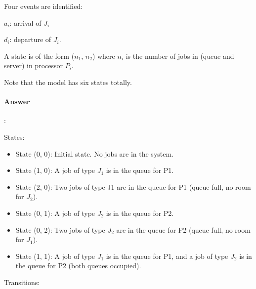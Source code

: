 \documentclass{article}
\begin{document}
\begin{tcolorbox}
  Four events are identified: 
  
  $a_i$: arrival of $J_i$ 

  $d_i$: departure of $J_i$.
  
  A state is of the form ($n_1$, $n_2$) where $n_i$ is the number of jobs in (queue and server) in processor $P_i$. 
  
  Note that the model has six states totally.
\end{tcolorbox}

\paragraph{Answer}:


States:

\begin{itemize}
  \item State (0, 0): Initial state. No jobs are in the system.
  \item State (1, 0): A job of type $J_1$ is in the queue for P1.
  \item State (2, 0): Two jobs of type J1 are in the queue for P1 (queue full, no room for $J_2$).
  \item State (0, 1): A job of type $J_2$ is in the queue for P2.
  \item State (0, 2): Two jobs of type $J_2$ are in the queue for P2 (queue full, no room for $J_1$).
  \item State (1, 1): A job of type $J_1$ is in the queue for P1, and a job of type $J_2$ is in the queue for P2 (both queues occupied).
\end{itemize}

Transitions:
\end{document}
